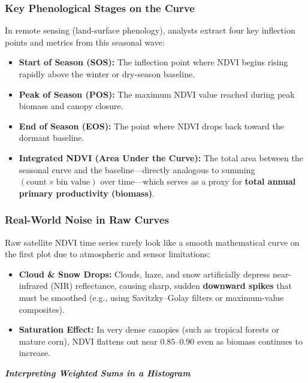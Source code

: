 \documentclass[12pt, letterpaper]{article}
\begin{document}
\subsubsection*{Key Phenological Stages on the Curve}

In remote sensing (land-surface phenology), analysts extract four key inflection points and metrics from this seasonal wave:

\begin{itemize}
    \item \textbf{Start of Season (SOS):} The inflection point where NDVI begins rising rapidly above the winter or dry-season baseline.
    \item \textbf{Peak of Season (POS):} The maximum NDVI value reached during peak biomass and canopy closure.
    \item \textbf{End of Season (EOS):} The point where NDVI drops back toward the dormant baseline.
    \item \textbf{Integrated NDVI (Area Under the Curve):} The total area between the seasonal curve and the baseline---directly analogous to summing $(\text{count} \times \text{bin value})$ over time---which serves as a proxy for \textbf{total annual primary productivity (biomass)}.
\end{itemize}

\subsubsection*{Real-World Noise in Raw Curves}

Raw satellite NDVI time series rarely look like a smooth mathematical curve on the first plot due to atmospheric and sensor limitations:

\begin{itemize}
    \item \textbf{Cloud \& Snow Drops:} Clouds, haze, and snow artificially depress near-infrared (NIR) reflectance, causing sharp, sudden \textbf{downward spikes} that must be smoothed (e.g., using Savitzky--Golay filters or maximum-value composites).
    \item \textbf{Saturation Effect:} In very dense canopies (such as tropical forests or mature corn), NDVI flattens out near $0.85\text{--}0.90$ even as biomass continues to increase.
\end{itemize}


\bigskip 
\LARGE
\begin{flushleft}
\textbf{\textit{Interpreting Weighted Sums in a Histogram}}
\end{flushleft}
\normalsize
\end{document}
